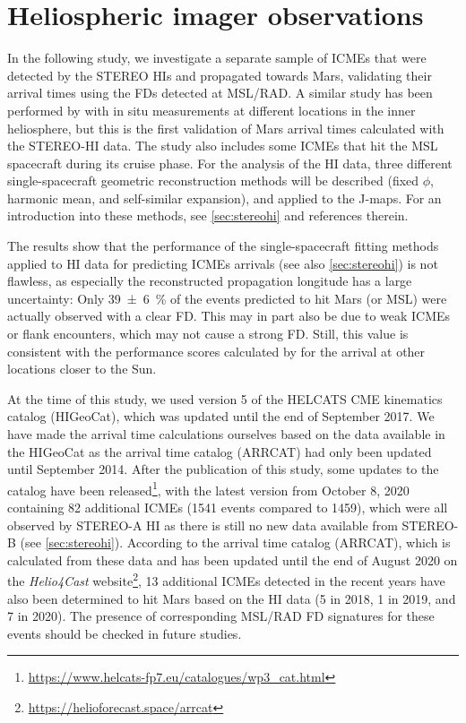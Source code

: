 

\section{Heliospheric imager observations}
In the following study, we investigate a separate sample of \acp{ICME} that were detected by the \ac{STEREO} \acp{HI} and propagated towards Mars, validating their arrival times using the \acp{FD} detected at \ac{MSL}/\ac{RAD}. A similar study has been performed by \citet{Moestl-2017-HelcatsHSO} with in situ measurements at different locations in the inner heliosphere, but this is the first validation of Mars arrival times calculated with the \ac{STEREO}-\ac{HI} data. The study also includes some \acp{ICME} that hit the \ac{MSL} spacecraft during its cruise phase.
For the analysis of the HI data, three different single-spacecraft geometric reconstruction methods will be described (fixed $\phi$, harmonic mean, and self-similar expansion), and applied to the J-maps. For an introduction into these methods, see \autoref{sec:stereohi} and references therein.

The results show that the performance of the single-spacecraft fitting methods applied to \ac{HI} data for predicting \acp{ICME} arrivals (see also \autoref{sec:stereohi}) is not flawless, as especially the reconstructed propagation longitude has a large uncertainty: Only \SI{39+-6}{\percent} of the events predicted to hit Mars (or \ac{MSL}) were actually observed with a clear \ac{FD}. This may in part also be due to weak \acp{ICME} or flank encounters, which may not cause a strong \ac{FD}. Still, this value is consistent with the performance scores calculated by \citet{Moestl-2017-HelcatsHSO} for the arrival at other locations closer to the Sun.

At the time of this study, we used version 5 of the \acs{HELCATS} CME kinematics catalog (HIGeoCat), which was updated until the end of September 2017. We have made the arrival time calculations ourselves based on the data available in the HIGeoCat as the arrival time catalog (ARRCAT) had only been updated until September 2014.
After the publication of this study, some updates to the catalog have been released\footnote{\url{https://www.helcats-fp7.eu/catalogues/wp3_cat.html}}, with the latest version from October 8, 2020 containing 82 additional \acp{ICME} (\num{1541} events compared to \num{1459}), which were all observed by \ac{STEREO}-A \ac{HI} as there is still no new data available from \ac{STEREO}-B (see \autoref{sec:stereohi}). According to the arrival time catalog (ARRCAT), which is calculated from these data and has been updated until the end of August 2020 on the \textit{Helio4Cast} website\footnote{\url{https://helioforecast.space/arrcat}}, 13 additional \acp{ICME} detected in the recent years have also been determined to hit Mars based on the \ac{HI} data (5 in 2018, 1 in 2019, and 7 in 2020). The presence of corresponding \ac{MSL}/\ac{RAD} \ac{FD} signatures for these events should be checked in future studies.

